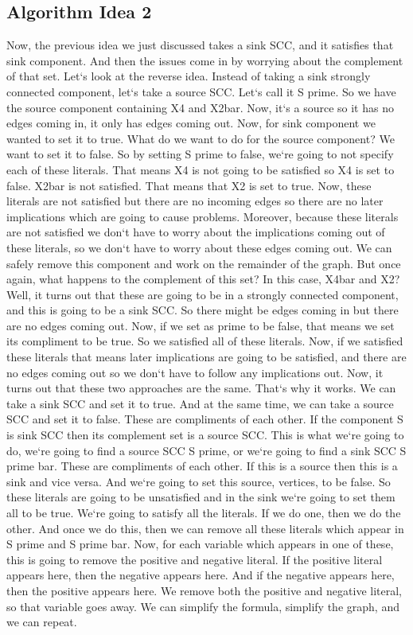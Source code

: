 \subsection{Algorithm Idea 2}
Now, the previous idea we just discussed takes a sink SCC, and it satisfies that sink component.
And then the issues come in by worrying about the complement of that set.
Let`s look at the reverse idea.
Instead of taking a sink strongly connected component, let`s take a source SCC\@.
Let`s call it S prime.
So we have the source component containing X4 and X2bar.
Now, it`s a source so it has no edges coming in, it only has edges coming out.
Now, for sink component we wanted to set it to true.
What do we want to do for the source component? We want to set it to false.
So by setting S prime to false, we`re going to not specify each of these literals.
That means X4 is not going to be satisfied so X4 is set to false.
X2bar is not satisfied.
That means that X2 is set to true.
Now, these literals are not satisfied but there are no incoming edges so there are no later implications which are going to cause problems.
Moreover, because these literals are not satisfied we don`t have to worry about the implications coming out of these literals, so we don`t have to worry about these edges coming out.
We can safely remove this component and work on the remainder of the graph.
But once again, what happens to the complement of this set? In this case, X4bar and X2? Well, it turns out that these are going to be in a strongly connected component, and this is going to be a sink SCC\@.
So there might be edges coming in but there are no edges coming out.
Now, if we set as prime to be false, that means we set its compliment to be true.
So we satisfied all of these literals.
Now, if we satisfied these literals that means later implications are going to be satisfied, and there are no edges coming out so we don`t have to follow any implications out.
Now, it turns out that these two approaches are the same.
That`s why it works.
We can take a sink SCC and set it to true.
And at the same time, we can take a source SCC and set it to false.
These are compliments of each other.
If the component S is sink SCC then its complement set is a source SCC\@.
This is what we`re going to do, we`re going to find a source SCC S prime, or we`re going to find a sink SCC S prime bar.
These are compliments of each other.
If this is a source then this is a sink and vice versa.
And we`re going to set this source, vertices, to be false.
So these literals are going to be unsatisfied and in the sink we`re going to set them all to be true.
We`re going to satisfy all the literals.
If we do one, then we do the other.
And once we do this, then we can remove all these literals which appear in S prime and S prime bar.
Now, for each variable which appears in one of these, this is going to remove the positive and negative literal.
If the positive literal appears here, then the negative appears here.
And if the negative appears here, then the positive appears here.
We remove both the positive and negative literal, so that variable goes away.
We can simplify the formula, simplify the graph, and we can repeat.

